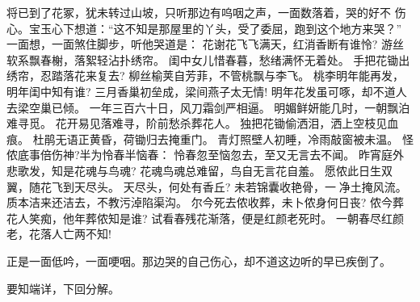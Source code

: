 将已到了花冢，犹未转过山坡，只听那边有呜咽之声，一面数落着，哭的好不
伤心。宝玉心下想道：“这不知是那屋里的丫头，受了委屈，跑到这个地方来哭？”
一面想，一面煞住脚步，听他哭道是：
花谢花飞飞满天，红消香断有谁怜?
游丝软系飘春榭，落絮轻沾扑绣帘。
闺中女儿惜春暮，愁绪满怀无着处。
手把花锄出绣帘，忍踏落花来复去?
柳丝榆荚自芳菲，不管桃飘与李飞。
桃李明年能再发，明年闺中知有谁?
三月香巢初垒成，梁间燕子太无情!
明年花发虽可啄，却不道人去梁空巢已倾。
一年三百六十日，风刀霜剑严相逼。
明媚鲜妍能几时，一朝飘泊难寻觅。
花开易见落难寻，阶前愁杀葬花人。
独把花锄偷洒泪，洒上空枝见血痕。
杜鹃无语正黄昏，荷锄归去掩重门。
青灯照壁人初睡，冷雨敲窗被未温。
怪侬底事倍伤神?半为怜春半恼春：
怜春忽至恼忽去，至又无言去不闻。
昨宵庭外悲歌发，知是花魂与鸟魂?
花魂鸟魂总难留，鸟自无言花自羞。
愿侬此日生双翼，随花飞到天尽头。
天尽头，何处有香丘?
未若锦囊收艳骨，一净土掩风流。
质本洁来还洁去，不教污淖陷渠沟。
尔今死去侬收葬，未卜侬身何日丧?
侬今葬花人笑痴，他年葬侬知是谁?
试看春残花渐落，便是红颜老死时。
一朝春尽红颜老，花落人亡两不知!

正是一面低吟，一面哽咽。那边哭的自己伤心，却不道这边听的早已疾倒了。

要知端详，下回分解。